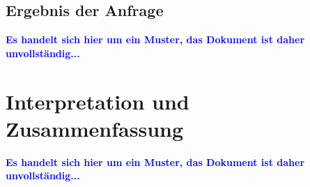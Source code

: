 \documentclass[a4paper,10pt,parskip]{article}
\begin{document}
\subsection{Ergebnis der Anfrage}


\vspace{0.5cm}\textcolor{blue}{\textbf{Es handelt sich hier um ein Muster, das Dokument ist daher unvollständig...}}


\section{Interpretation und Zusammenfassung}

\vspace{0.5cm}\textcolor{blue}{\textbf{Es handelt sich hier um ein Muster, das Dokument ist daher unvollständig...}}



\end{document}

